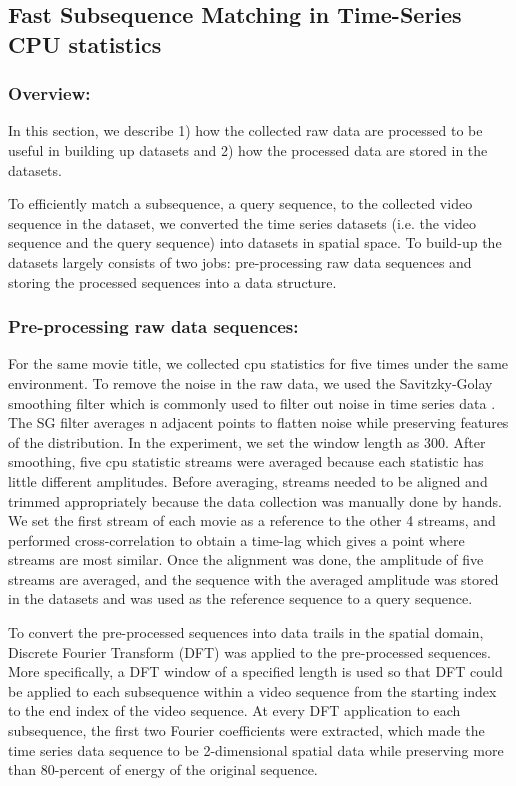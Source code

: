 \subsection{Fast Subsequence Matching in Time-Series CPU statistics}
\label{sec:kookjin}

\subsubsection{Overview:}
In this section, we describe 1) how the collected raw data are processed to be useful in building up datasets and 2) how the processed data are stored in the datasets.

To efficiently match a subsequence, a query sequence, to the collected video sequence in the dataset, we converted the time series datasets (i.e. the video sequence and the query sequence) into datasets in spatial space. To build-up the datasets largely consists of two jobs: pre-processing raw data sequences and storing the processed sequences into a data structure.

\subsubsection{Pre-processing raw data sequences:}
For the same movie title, we collected cpu statistics for five times under the same environment. To remove the noise in the raw data, we used the Savitzky-Golay smoothing filter which is commonly used to filter out noise in time series data \cite{SGfilter}. The SG filter averages n adjacent points to flatten noise while preserving features of the distribution. In the experiment, we set the window length as 300. After smoothing, five cpu statistic streams were averaged because each statistic has little different amplitudes. Before averaging, streams needed to be aligned and trimmed appropriately because the data collection was manually done by hands. We set the first stream of each movie as a reference to the other 4 streams, and performed cross-correlation to obtain a time-lag which gives a point where streams are most similar. Once the alignment was done, the amplitude of five streams are averaged, and the sequence with the averaged amplitude was stored in the datasets and was used as the reference sequence to a query sequence.

To convert the pre-processed sequences into data trails in the spatial domain, Discrete Fourier Transform (DFT) was applied to the pre-processed sequences. More specifically, a  DFT window of a specified length is used so that DFT could be applied to each subsequence within a video sequence from the starting index to the end index of the video sequence. At every DFT application to each subsequence, the first two Fourier coefficients were extracted, which made the time series data sequence to be 2-dimensional spatial data while preserving more than 80-percent of energy of the original sequence.

